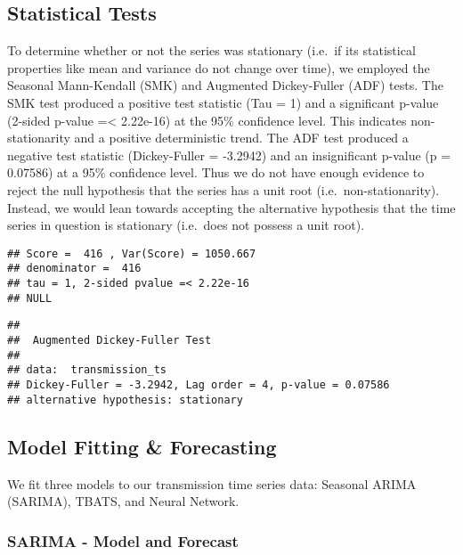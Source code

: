 \documentclass[
]{article}
\begin{document}
\hypertarget{statistical-tests}{%
\subsection{Statistical Tests}\label{statistical-tests}}

To determine whether or not the series was stationary (i.e.~if its
statistical properties like mean and variance do not change over time),
we employed the Seasonal Mann-Kendall (SMK) and Augmented Dickey-Fuller
(ADF) tests. The SMK test produced a positive test statistic (Tau = 1)
and a significant p-value (2-sided p-value =\textless{} 2.22e-16) at the
95\% confidence level. This indicates non-stationarity and a positive
deterministic trend. The ADF test produced a negative test statistic
(Dickey-Fuller = -3.2942) and an insignificant p-value (p = 0.07586) at
a 95\% confidence level. Thus we do not have enough evidence to reject
the null hypothesis that the series has a unit root
(i.e.~non-stationarity). Instead, we would lean towards accepting the
alternative hypothesis that the time series in question is stationary
(i.e.~does not possess a unit root).

\begin{verbatim}
## Score =  416 , Var(Score) = 1050.667
## denominator =  416
## tau = 1, 2-sided pvalue =< 2.22e-16
## NULL
\end{verbatim}

\begin{verbatim}
## 
##  Augmented Dickey-Fuller Test
## 
## data:  transmission_ts
## Dickey-Fuller = -3.2942, Lag order = 4, p-value = 0.07586
## alternative hypothesis: stationary
\end{verbatim}

\hypertarget{model-fitting-forecasting}{%
\subsection{Model Fitting \&
Forecasting}\label{model-fitting-forecasting}}

We fit three models to our transmission time series data: Seasonal ARIMA
(SARIMA), TBATS, and Neural Network.

\hypertarget{sarima---model-and-forecast}{%
\subsubsection{SARIMA - Model and
Forecast}\label{sarima---model-and-forecast}}
\end{document}
